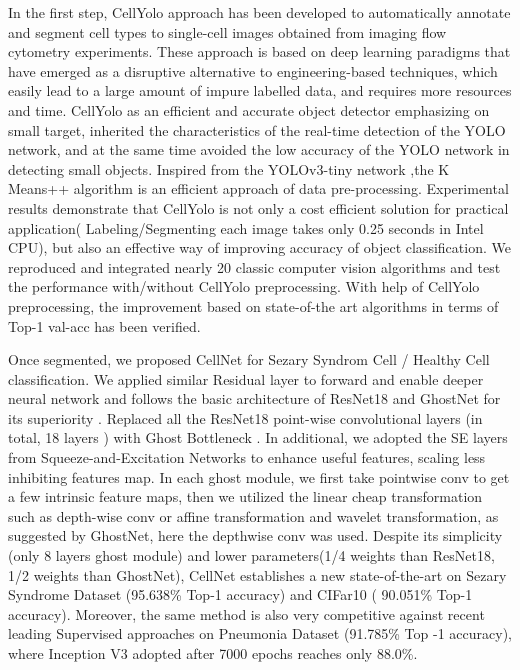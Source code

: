 In the first step, CellYolo approach has been developed to automatically annotate and segment cell types to single-cell images obtained from imaging flow cytometry experiments. These approach is based on deep learning paradigms that have emerged as a disruptive alternative to engineering-based techniques, which easily lead to a large amount of impure labelled data, and requires more resources and time. CellYolo as an efficient and accurate object detector emphasizing on small target, inherited the characteristics of the real-time detection of the YOLO network\cite{33}, and at the same time avoided the low accuracy of the YOLO network in detecting small objects. Inspired from the YOLOv3-tiny network ,the K Means++ algorithm is an efficient approach of data pre-processing\cite{18}. Experimental results demonstrate that CellYolo is not only a cost efficient solution for practical application( Labeling/Segmenting each image takes only 0.25 seconds in Intel CPU), but also an effective way of improving accuracy of object classification. We reproduced and integrated nearly 20 classic computer vision algorithms and test the performance with/without CellYolo preprocessing. With help of CellYolo preprocessing, the improvement based on state-of-the art algorithms in terms of Top-1 val-acc has been verified.

Once segmented, we proposed CellNet for Sezary Syndrom Cell / Healthy Cell classification. We applied similar Residual layer to forward and enable deeper neural network and follows the basic architecture of ResNet18 and GhostNet for its superiority \cite{19}\cite{20}. Replaced all the ResNet18 \cite{20} point-wise convolutional layers (in total, 18 layers ) with Ghost Bottleneck \cite{19}. In additional, we adopted the SE layers from Squeeze-and-Excitation Networks \cite{24} to enhance useful features, scaling less inhibiting features map. In each ghost module, we first take pointwise conv to get a few intrinsic feature maps, then we utilized the linear cheap transformation such as depth-wise conv or affine transformation and wavelet transformation, as suggested by GhostNet\cite{19}, here the depthwise conv was used.
Despite its simplicity (only 8 layers ghost module) and lower parameters(1/4 weights than ResNet18\cite{20}, 1/2 weights than GhostNet\cite{19}), CellNet establishes a new state-of-the-art on Sezary Syndrome Dataset (95.638\% Top-1 accuracy) and CIFar10 ( 90.051\% Top-1 accuracy)\cite{21}. Moreover, the same method is also very competitive against recent leading Supervised approaches on Pneumonia Dataset (91.785\% Top -1 accuracy), where Inception V3 adopted after 7000 epochs reaches only 88.0\%\cite{38}.

